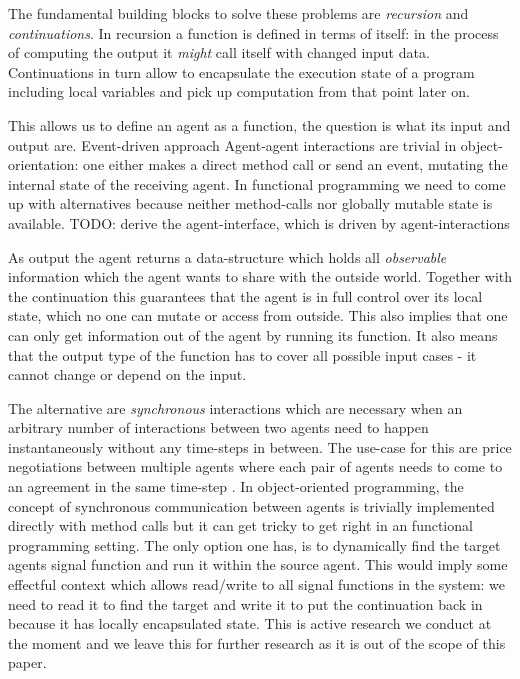 The fundamental building blocks to solve these problems are \textit{recursion} and \textit{continuations}. In recursion a function is defined in terms of itself: in the process of computing the output it \textit{might} call itself with changed input data. Continuations in turn allow to encapsulate the execution state of a program including local variables and pick up computation from that point later on.

This allows us to define an agent as a function, the question is what its input and output are. Event-driven approach \cite{meyer_event-driven_2014} Agent-agent interactions are trivial in object-orientation: one either makes a direct method call or send an event, mutating the internal state of the receiving agent. In functional programming we need to come up with alternatives because neither method-calls nor globally mutable state is available.
TODO: derive the agent-interface, which is driven by agent-interactions

As output the agent returns a data-structure which holds all \textit{observable} information which the agent wants to share with the outside world. Together with the continuation this guarantees that the agent is in full control over its local state, which no one can mutate or access from outside. This also implies that one can only get information out of the agent by running its function. It also means that the output type of the function has to cover all possible input cases - it cannot change or depend on the input. 

The alternative are \textit{synchronous} interactions which are necessary when an arbitrary number of interactions between two agents need to happen instantaneously without any time-steps in between. The use-case for this are price negotiations between multiple agents where each pair of agents needs to come to an agreement in the same time-step \cite{epstein_growing_1996}. In object-oriented programming, the concept of synchronous communication between agents is trivially implemented directly with method calls but it can get tricky to get right in an functional programming setting. The only option one has, is to dynamically find the target agents signal function and run it within the source agent. This would imply some effectful context which allows read/write to all signal functions in the system: we need to read it to find the target and write it to put the continuation back in because it has locally encapsulated state. This is active research we conduct at the moment and we leave this for further research as it is out of the scope of this paper.


